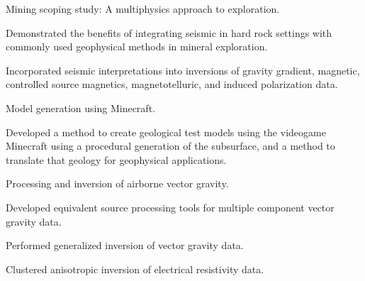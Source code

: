 \begin{cventries}
{\begin{cvparagraph}
      \vspace{7pt}
      Mining scoping study: A multiphysics approach to exploration.
      \vspace{7pt}
      \end{cvparagraph}
      \begin{cvitems}
        \item {Demonstrated the benefits of integrating seismic in hard rock settings with commonly used geophysical methods in mineral exploration.}
        \item {Incorporated seismic interpretations into inversions of gravity gradient, magnetic, controlled source magnetics, magnetotelluric, and induced polarization data.}
        \vspace{10pt}
      \end{cvitems}
    }
    \cventry
    {} %
    {} %
    {} %
    {} %
    {
      \begin{cvparagraph}
      \vspace{7pt}
      Model generation using Minecraft.
      \vspace{7pt}
      \end{cvparagraph}
      \begin{cvitems}
        \item {Developed a method to create geological test models using the videogame Minecraft using a procedural generation of the subsurface, and a method to translate that geology for geophysical applications.}
        \vspace{10pt}
      \end{cvitems}
      \begin{cvparagraph}
      \vspace{7pt}
      Processing and inversion of airborne vector gravity.
      \vspace{7pt}
      \end{cvparagraph}
      \begin{cvitems}
        \item {Developed equivalent source processing tools for multiple component vector gravity data.}
        \item {Performed generalized inversion of vector gravity data.}
        \vspace{10pt}
      \end{cvitems}
      \begin{cvparagraph}
      \vspace{7pt}
      Clustered anisotropic inversion of electrical resistivity data.

\end{cvparagraph}}
\end{cventries}
